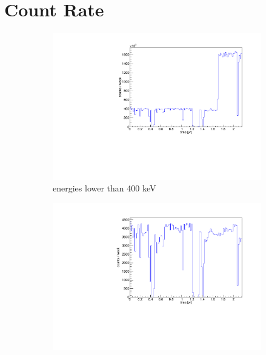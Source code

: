 \documentclass[encoding=utf8,british]{tumphthesis}
\begin{document}
\\



\section{Count Rate}
\label{sec:EventAct}

\begin{figure}[t!]
	\centering
	\begin{subfigure}{.475\textwidth}
		\centering
		\includegraphics[width=\textwidth]{./Bilder/ZeitverlaufALLE.pdf}
		\caption{energies lower than 400 keV}
		\label{fig:ZeitAll}
	\end{subfigure}\hfill%
	\begin{subfigure}{.475\textwidth}
		\centering
		\includegraphics[width=\textwidth]{./Bilder/ZeitverlaufLimits.pdf}

\end{subfigure}
\end{figure}
\end{document}
